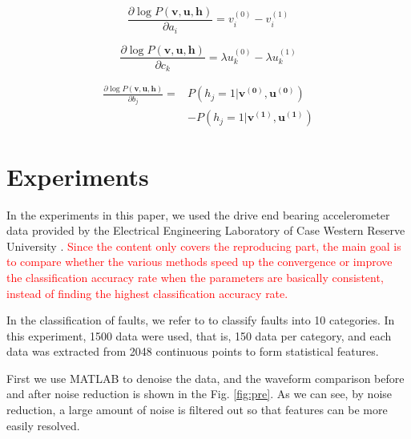 \documentclass{modified}
\begin{document}
\begin{equation}
\frac{\partial \log P(\boldsymbol{v}, \boldsymbol{u}, \boldsymbol{h})}{\partial a_{i}}=v_i^{(0)}-v_i^{(1)}
\end{equation}

\begin{equation}
\frac{\partial \log P(\boldsymbol{v}, \boldsymbol{u}, \boldsymbol{h})}{\partial c_{k}}=\lambda u_k^{(0)}-\lambda u_k^{(1)}
\end{equation}

\begin{equation}
\begin{aligned} 
\frac{\partial \log P(\boldsymbol{v}, \boldsymbol{u}, \boldsymbol{h})}{\partial b_{j}}=&P(h_j=1|\boldsymbol{v^{(0)}},\boldsymbol{u^{(0)}})\\&-P(h_j=1|\boldsymbol{v^{(1)}},\boldsymbol{u^{(1)}})
\end{aligned}
\end{equation}

\section{Experiments}
In the experiments in this paper, we used the drive end bearing accelerometer data provided by the Electrical Engineering Laboratory of Case Western Reserve University \cite{data}. \textcolor{red}{Since the content only covers the reproducing part, the main goal is to compare whether the various methods speed up the convergence or improve the classification accuracy rate when the parameters are basically consistent, instead of finding the highest classification accuracy rate.}

In the classification of faults, we refer to \cite{guangquan2016fault} to classify faults into 10 categories. In this experiment, 1500 data were used, that is, 150 data per category, and each data was extracted from 2048 continuous points to form statistical features.

First we use MATLAB to denoise the data, and the waveform comparison before and after noise reduction is shown in the Fig. \ref{fig:pre}. As we can see, by noise reduction, a large amount of noise is filtered out so that features can be more easily resolved.
\end{document}
